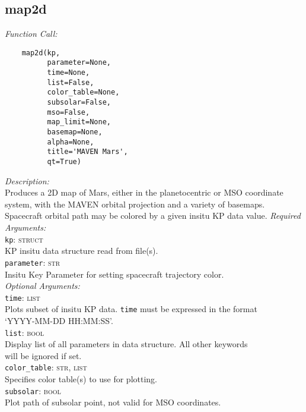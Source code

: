 \documentclass{article}
\begin{document}
\subsection{map2d}
\label{subsec:map2d}
\textit{Function Call:}\\
\vspace{-10mm}
\begin{verbatim}
    map2d(kp,  
          parameter=None, 
          time=None, 
          list=False, 
          color_table=None,
          subsolar=False,
          mso=False,
          map_limit=None,
          basemap=None,
          alpha=None,
          title='MAVEN Mars',
          qt=True)
\end{verbatim}
\vspace{-5mm}
\noindent
\textit{Description:}\\
\indent Produces a 2D map of Mars, either in the planetocentric or MSO coordinate\\
\indent system, with the MAVEN orbital projection and a variety of basemaps.\\
\indent Spacecraft orbital path may be colored by a given insitu KP data value.
\textit{Required Arguments:}\\
\indent \texttt{kp}: \textsc{struct}\\
\indent \indent KP insitu data structure read from file(s).\\ 
\indent \texttt{parameter}: \textsc{str}\\
\indent \indent Insitu Key Parameter for setting spacecraft trajectory color.\\
\textit{Optional Arguments:}\\
\indent \texttt{time}: \textsc{list}\\
\indent \indent Plots subset of insitu KP data. \texttt{time} must be expressed in the format \\
\indent \indent `YYYY-MM-DD HH:MM:SS'.\\
\indent \texttt{list}: \textsc{bool}\\
\indent \indent Display list of all parameters in data structure. All other keywords\\
\indent \indent will be ignored if set.\\
\indent \texttt{color\_table}: \textsc{str, list}\\
\indent \indent Specifies color table(s) to use for plotting.\\
\indent \indent \texttt{subsolar}: \textsc{bool}\\
\indent \indent Plot path of subsolar point, not valid for MSO coordinates.\\
\end{document}

